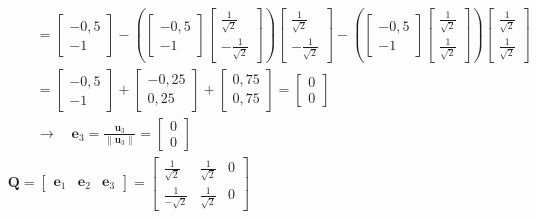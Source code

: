 \begin{align*}
	&\qquad=\begin{bmatrix}-0,5\\-1\end{bmatrix}-\left(\begin{bmatrix}-0,5\\-1\end{bmatrix}\begin{bmatrix}\frac{1}{\sqrt{2}}\\-\frac{1}{\sqrt{2}}\end{bmatrix}\right)\begin{bmatrix}\frac{1}{\sqrt{2}}\\-\frac{1}{\sqrt{2}}\end{bmatrix}-\left(\begin{bmatrix}-0,5\\-1\end{bmatrix}\begin{bmatrix}\frac{1}{\sqrt{2}}\\\frac{1}{\sqrt{2}}\end{bmatrix}\right)\begin{bmatrix}\frac{1}{\sqrt{2}}\\\frac{1}{\sqrt{2}}\end{bmatrix}& \\
	&\qquad=\begin{bmatrix}-0,5\\-1\end{bmatrix}+\begin{bmatrix}-0,25\\0,25\end{bmatrix}+\begin{bmatrix}0,75\\0,75\end{bmatrix}=\begin{bmatrix}0\\0\end{bmatrix}& \\
	&\qquad\rightarrow\quad\mathbf{e}_{3}=\frac{\mathbf{u}_{3}}{\|\mathbf{u}_{3}\|}=\begin{bmatrix}0\\0\end{bmatrix}& \\
	&\mathbf{Q}=\begin{bmatrix}\mathbf{e}_{1}&\mathbf{e}_{2}&\mathbf{e}_{3}\end{bmatrix}=
	\begin{bmatrix}
	\frac{1}{\sqrt{2}} & \frac{1}{\sqrt{2}} & 0 \\
	\frac{1}{-\sqrt{2}} & \frac{1}{\sqrt{2}} & 0

\end{bmatrix}
\end{align*}

